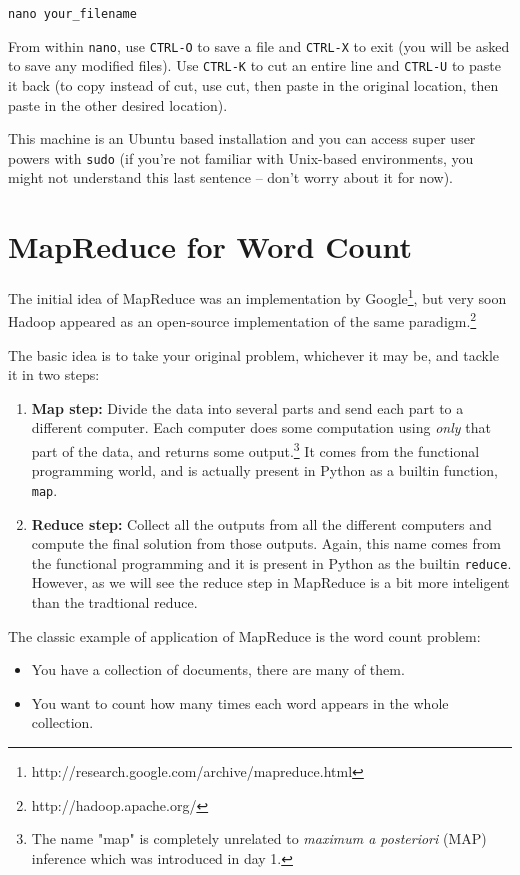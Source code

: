 \begin{verbatim}
nano your_filename
\end{verbatim}

From within \texttt{nano}, use \texttt{CTRL-O} to save a file and \texttt{CTRL-X} to exit (you will be asked to save any modified files). Use \texttt{CTRL-K} to cut an entire line and \texttt{CTRL-U} to paste it back (to copy instead of cut, use cut, then paste in the original location, then paste in the other desired location).

This machine is an Ubuntu based
installation and you can access super user powers with \texttt{sudo} (if you're
not familiar with Unix-based environments, you might not understand this last
sentence -- don't worry about it for now).

\section{MapReduce for Word Count}

The initial idea of MapReduce was an implementation by
Google\footnote{http://research.google.com/archive/mapreduce.html}, but very
soon Hadoop appeared as an open-source implementation of the same
paradigm.\footnote{http://hadoop.apache.org/}

The basic idea is to take your original problem, whichever it may be, and tackle it in two steps:
%
\begin{enumerate}
\item \textbf{Map step:} Divide the data into several parts and send each part
to a different computer. Each computer does some computation using \emph{only}
that part of the data, and returns some output.\footnote{The name "map" is completely
unrelated to \emph{maximum a posteriori} (MAP) inference which was introduced
in day 1.} It comes from the functional programming world, and is actually
present in Python as a builtin function, \verb+map+.
\item \textbf{Reduce step:} Collect all the outputs from all the different
computers and compute the final solution from those outputs. Again, this name
comes from the functional programming and it is present in Python as the builtin
\verb+reduce+. However, as we will see the reduce step in MapReduce is a bit
more inteligent than the tradtional reduce.
\end{enumerate}

The classic example of application of MapReduce is the word count problem:

\begin{itemize}
\item You have a collection of documents, there are many of them.
\item You want to count how many times each word appears in the whole collection.
\end{itemize}


